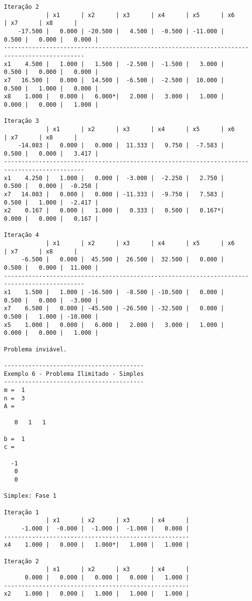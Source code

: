 \documentclass[12pt,a4paper]{article}
\begin{document}
\begin{tiny}
\begin{verbatim}
Iteração 2
            | x1      | x2      | x3      | x4      | x5      | x6      | x7      | x8      |
    -17.500 |   0.000 | -20.500 |   4.500 |  -0.500 | -11.000 |   0.500 |   0.000 |   0.000 |
---------------------------------------------------------------------------------------------
x1    4.500 |   1.000 |   1.500 |  -2.500 |  -1.500 |   3.000 |   0.500 |   0.000 |   0.000 |
x7   16.500 |   0.000 |  14.500 |  -6.500 |  -2.500 |  10.000 |   0.500 |   1.000 |   0.000 |
x8    1.000 |   0.000 |   6.000*|   2.000 |   3.000 |   1.000 |   0.000 |   0.000 |   1.000 |

Iteração 3
            | x1      | x2      | x3      | x4      | x5      | x6      | x7      | x8      |
    -14.083 |   0.000 |   0.000 |  11.333 |   9.750 |  -7.583 |   0.500 |   0.000 |   3.417 |
---------------------------------------------------------------------------------------------
x1    4.250 |   1.000 |   0.000 |  -3.000 |  -2.250 |   2.750 |   0.500 |   0.000 |  -0.250 |
x7   14.083 |   0.000 |   0.000 | -11.333 |  -9.750 |   7.583 |   0.500 |   1.000 |  -2.417 |
x2    0.167 |   0.000 |   1.000 |   0.333 |   0.500 |   0.167*|   0.000 |   0.000 |   0.167 |

Iteração 4
            | x1      | x2      | x3      | x4      | x5      | x6      | x7      | x8      |
     -6.500 |   0.000 |  45.500 |  26.500 |  32.500 |   0.000 |   0.500 |   0.000 |  11.000 |
---------------------------------------------------------------------------------------------
x1    1.500 |   1.000 | -16.500 |  -8.500 | -10.500 |   0.000 |   0.500 |   0.000 |  -3.000 |
x7    6.500 |   0.000 | -45.500 | -26.500 | -32.500 |   0.000 |   0.500 |   1.000 | -10.000 |
x5    1.000 |   0.000 |   6.000 |   2.000 |   3.000 |   1.000 |   0.000 |   0.000 |   1.000 |

Problema inviável.

----------------------------------------
Exemplo 6 - Problema Ilimitado - Simples
----------------------------------------
m =  1
n =  3
A =

   0   1   1

b =  1
c =

  -1
   0
   0

Simplex: Fase 1

Iteração 1
            | x1      | x2      | x3      | x4      |
     -1.000 |  -0.000 |  -1.000 |  -1.000 |   0.000 |
-----------------------------------------------------
x4    1.000 |   0.000 |   1.000*|   1.000 |   1.000 |

Iteração 2
            | x1      | x2      | x3      | x4      |
      0.000 |   0.000 |   0.000 |   0.000 |   1.000 |
-----------------------------------------------------
x2    1.000 |   0.000 |   1.000 |   1.000 |   1.000 |


\end{verbatim}
\end{tiny}
\end{document}
